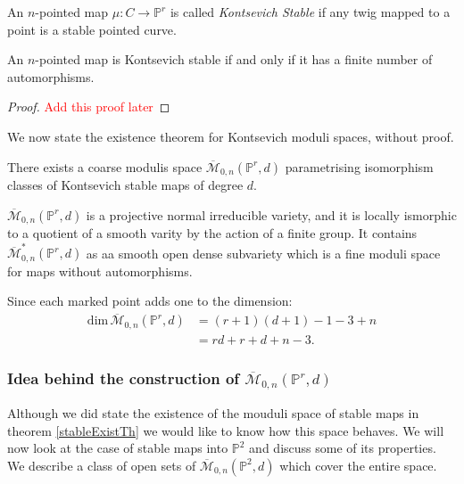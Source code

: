\begin{definition}
    An $n$-pointed map $\mu : C \to \mathbb{P}^{r}$ is called \textit{Kontsevich Stable} if any twig mapped to a point is a stable pointed curve.
\end{definition}
\begin{lemma}
    An $n$-pointed map is Kontsevich stable if and only if it has a finite number of automorphisms.
\end{lemma}
\begin{proof}
    \textcolor{red}{Add this proof later}
\end{proof}

\par We now state the existence theorem for Kontsevich moduli spaces, without proof.

\begin{theorem}
    \label{stableExistTh}
    There exists a coarse modulis space $\overline{\mathcal{M}}_{0,n}(\mathbb{P}^{r},d)$ parametrising isomorphism classes of Kontsevich stable maps of degree $d$.
\end{theorem}

\begin{theorem}
    $\overline{\mathcal{M}}_{0,n}(\mathbb{P}^{r},d)$ is a projective normal irreducible variety, and it is locally ismorphic to a quotient of a smooth varity by the action of a finite group.
    It contains $\overline{\mathcal{M}}^{*}_{0,n}(\mathbb{P}^{r},d)$ as aa smooth open dense subvariety which is a fine moduli space for maps without automorphisms.
\end{theorem}
\begin{remark}
    Since each marked point adds one to the dimension:
    \begin{align*}
        \text{dim}\,\overline{\mathcal{M}}_{0,n}(\mathbb{P}^{r},d) &= (r+1)(d+1) - 1 - 3 +n\\
                                                                 &= rd + r + d + n - 3.
    \end{align*}
\end{remark}
\subsubsection{Idea behind the construction of $\overline{\mathcal{M}}_{0,n}(\mathbb{P}^{r},d)$}
Although we did state the existence of the mouduli space of stable maps in theorem \ref{stableExistTh} we would like to know how this space behaves.
We will now look at the case of stable maps into $\mathbb{P}^{2}$ and discuss some of its properties.
We describe a class of open sets of $\overline{\mathcal{M}}_{0,n}(\mathbb{P}^{2},d)$ which cover the entire space.

